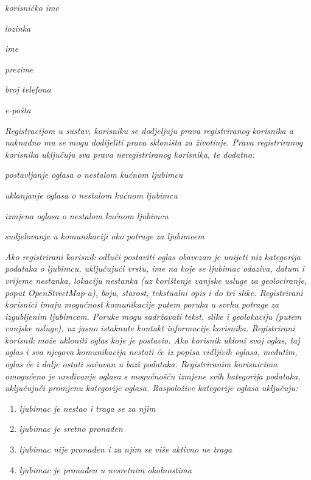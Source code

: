 		\begin{packed_item}
			\item \textit{korisničko ime}
			\item \textit{lozinka}
			\item \textit{ime}
			\item \textit{prezime}
			\item \textit{broj telefona}
			\item \textit{e-pošta}
		\end{packed_item}
		
		\textit{Registracijom u sustav, korisniku se dodjeljuju prava registriranog korisnika a naknadno mu se mogu dodijeliti prava skloništa za životinje. Prava registriranog korisnika uključuju sva prava neregistriranog korisnika, te dodatno:}
		
		\begin{packed_item}
			\item \textit{postavljanje oglasa o nestalom kućnom ljubimcu}
			\item \textit{uklanjanje oglasa o nestalom kućnom ljubimcu}
			\item \textit{izmjena oglasa o nestalom kućnom ljubimcu}
			\item \textit{sudjelovanje u komunikaciji oko potrage za ljubimcem}
		\end{packed_item}
		
		\textit{Ako registrirani korisnik odluči postaviti oglas obavezan je unijeti niz kategorija podataka o ljubimcu, uključujući vrstu, ime na koje se ljubimac odaziva, datum i vrijeme nestanka, lokaciju nestanka (uz korištenje vanjske usluge za geolociranje, poput OpenStreetMap-a), boju, starost, tekstualni opis i do tri slike. Registrirani korisnici imaju mogućnost komunikacije putem poruka u svrhu potrage za izgubljenim ljubimcem. Poruke mogu sadržavati tekst, slike i geolokaciju (putem vanjske usluge), uz jasno istaknute kontakt informacije korisnika. Registrirani korisnik može ukloniti oglas koje je postavio. Ako korisnik ukloni svoj oglas, taj oglas i sva njegova komunikacija nestati će iz popisa vidljivih oglasa, međutim, oglas će i dalje ostati sačuvan u bazi podataka. Registriranim korisnicima omogućeno je uređivanje oglasa s mogućnošću izmjene svih kategorija podataka, uključujući promjenu kategorije oglasa. Raspoložive kategorije oglasa uključuju:}
		
		\begin{enumerate}
			\item \textit{ljubimac je nestao i traga se za njim}
			\item \textit{ljubimac je sretno pronađen}
			\item \textit{ljubimac nije pronađen i za njim se više aktivno ne traga}
			\item \textit{ljubimac je pronađen u nesretnim okolnostima}
		\end{enumerate}
		
